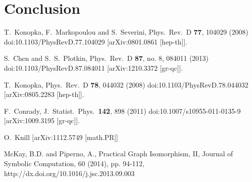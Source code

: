 \documentclass[prd,12pt,nofootinbib]{revtex4}
\begin{document}
\section{Conclusion}  
\begin{thebibliography}{99}
  


  T.~Konopka, F.~Markopoulou and S.~Severini,
  Phys.\ Rev.\ D {\bf 77}, 104029 (2008)
  doi:10.1103/PhysRevD.77.104029
  [arXiv:0801.0861 [hep-th]].

  S.~Chen and S.~S.~Plotkin,
  Phys.\ Rev.\ D {\bf 87}, no. 8, 084011 (2013)
  doi:10.1103/PhysRevD.87.084011
  [arXiv:1210.3372 [gr-qc]].


  T.~Konopka,
  Phys.\ Rev.\ D {\bf 78}, 044032 (2008)
  doi:10.1103/PhysRevD.78.044032
  [arXiv:0805.2283 [hep-th]].

  F.~Conrady,
  J.\ Statist.\ Phys.\  {\bf 142}, 898 (2011)
  doi:10.1007/s10955-011-0135-9
  [arXiv:1009.3195 [gr-qc]].
  
   O.~Knill
   [arXiv:1112.5749 [math.PR]]
  
  McKay, B.D. and Piperno, A.,
  Practical Graph Isomorphism, II, 
  Journal of Symbolic Computation, 60 (2014), pp. 94-112, http://dx.doi.org/10.1016/j.jsc.2013.09.003
 
\end{thebibliography}
\end{document}
